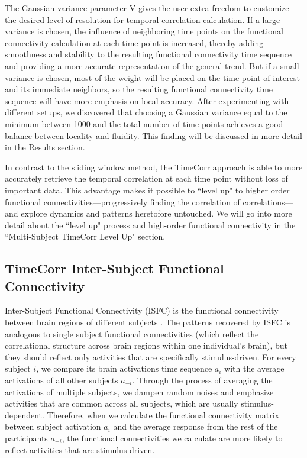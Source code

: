 \documentclass[11pt]{article}
\begin{document}
The Gaussian variance parameter V gives the user extra freedom to customize the desired level of resolution for temporal correlation calculation. If a large variance is chosen, the influence of neighboring time points on the functional connectivity calculation at each time point is increased, thereby adding smoothness and stability to the resulting functional connectivity time sequence and providing a more accurate representation of the general trend. But if a small variance is chosen, most of the weight will be placed on the time point of interest and its immediate neighbors, so the resulting functional connectivity time sequence will have more emphasis on local accuracy. After experimenting with different setups, we discovered that choosing a Gaussian variance equal to the minimum between 1000 and the total number of time points achieves a good balance between locality and fluidity. This finding will be discussed in more detail in the Results section.

In contrast to the sliding window method, the TimeCorr approach is able to more accurately retrieve the temporal correlation at each time point without loss of important data. This advantage makes it possible to ``level up" to higher order functional connectivities---progressively finding the correlation of correlations---and explore dynamics and patterns heretofore untouched. We will go into more detail about the ``level up" process and high-order functional connectivity in the ``Multi-Subject TimeCorr Level Up" section.

\subsection{TimeCorr Inter-Subject Functional Connectivity}

Inter-Subject Functional Connectivity (ISFC) is the functional connectivity between brain regions of different subjects \citep{jeremy2017}\citep{hasson2016}. The patterns recovered by ISFC is analogous to single subject functional connectivities (which reflect the correlational structure across brain regions within one individual's
brain), but they should reflect only activities that are specifically stimulus-driven. For every subject $i$, we compare its brain activations time sequence $a_i$ with the average activations of all other subjects $a_{-i}$. Through the process of averaging the activations of multiple subjects, we dampen random noises and emphasize activities that are common across all subjects, which are usually stimulus-dependent. Therefore, when we calculate the functional connectivity matrix between subject activation $a_i$ and the average response from the rest of the participants $a_{-i}$, the functional connectivities we calculate are more likely to reflect activities that are stimulus-driven.
\end{document}
